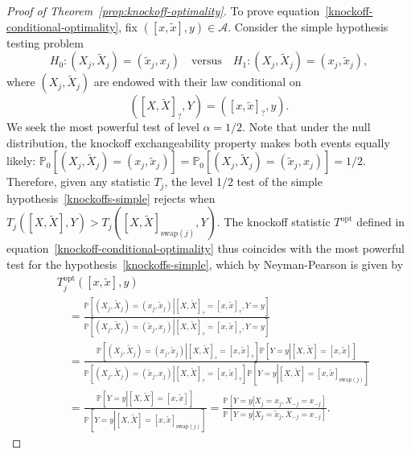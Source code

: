 \documentclass[12pt]{article}
\theoremstyle{definition}
\theoremstyle{remark}
\newcommand{\srx}{X}
\newcommand{\sfx}{x}
\newcommand{\srxk}{\widetilde X}
\newcommand{\sfxk}{\widetilde x}
\newcommand{\sry}{Y}
\newcommand{\sfy}{y}
\begin{document}
\begin{proof}[Proof of Theorem~\ref{prop:knockoff-optimality}]
	
	To prove equation~\eqref{knockoff-conditional-optimality}, fix $([\sfx, \sfxk], \sfy) \in \mathcal A$. Consider the simple hypothesis testing problem
	\begin{equation}
	H_0: (\srx_j, \srxk_j) = (\sfxk_j, \sfx_j) \quad \text{versus} \quad H_1: (\srx_j, \srxk_j) = (\sfx_j, \sfxk_j),
	\label{knockoffs-simple}
	\end{equation}
	where $(\srx_j, \srxk_j)$ are endowed with their law conditional on 
	\begin{equation*}
	([\srx, \srxk]_?, \sry) = ([\sfx, \sfxk]_?, \sfy).
	\end{equation*}
	We seek the most powerful test of level $\alpha = 1/2$. Note that under the null distribution, the knockoff exchangeability property makes both events equally likely: $\mathbb P_0[(\srx_j, \srxk_j) = (\sfx_j, \sfxk_j)] = \mathbb P_0[(\srx_j, \srxk_j) = (\sfxk_j, \sfx_j)] = 1/2$. Therefore, given any statistic $T_j$, the level 1/2 test of the simple hypothesis~\eqref{knockoffs-simple} rejects when $T_j([\srx, \srxk], \sry) > T_j([\srx, \srxk]_{\text{swap}(j)}, \sry)$. The knockoff statistic $T^{\text{opt}}$ defined in equation~\eqref{knockoff-conditional-optimality} thus coincides with the most powerful test for the hypothesis~\eqref{knockoffs-simple}, which by Neyman-Pearson is given by
	\begin{equation*}
	\begin{split}
	&T^{\text{opt}}_j([\sfx, \sfxk], \sfy) \\
	&\quad= \frac{\mathbb P\left[\left.(\srx_j, \srxk_j) = (\sfx_j, \sfxk_j)\right|[\srx, \srxk]_? = [\sfx, \sfxk]_?, \sry = \sfy\right]}{\mathbb P\left[\left.(\srx_j, \srxk_j) = (\sfxk_j, \sfx_j)\right|[\srx, \srxk]_? = [\sfx, \sfxk]_?, \sry = \sfy\right]} \\
	&\quad= \frac{\mathbb P\left[\left.(\srx_j, \srxk_j) = (\sfx_j, \sfxk_j)\right| [\srx, \srxk]_? = [\sfx, \sfxk]_?\right]\mathbb P\left[\sry = \sfy\left|[\srx, \srxk] = [\sfx,\sfxk]\right.\right]}{\mathbb P\left[\left.(\srx_j, \srxk_j) = (\sfxk_j, \sfx_j)\right| [\srx, \srxk]_? = [\sfx, \sfxk]_?\right]\mathbb P\left[\sry = \sfy\left|[\srx, \srxk] = [\sfx,\sfxk]_{\text{swap}(j)}\right.\right]} \\
	&\quad= \frac{\mathbb P\left[\sry = \sfy\left|[\srx, \srxk] = [\sfx,\sfxk]\right.\right]}{\mathbb P\left[\sry = \sfy\left|[\srx, \srxk] = [\sfx,\sfxk]_{\text{swap}(j)}\right.\right]} = \frac{\mathbb P\left[\sry = \sfy\left|\srx_j = \sfx_j, \srx_{-j} = \sfx_{-j}\right.\right]}{\mathbb P\left[\sry = \sfy\left|\srx_j = \sfxk_j, \srx_{-j} = \sfx_{-j}\right.\right]}.

\end{split}
\end{equation*}
\end{proof}
\end{document}
